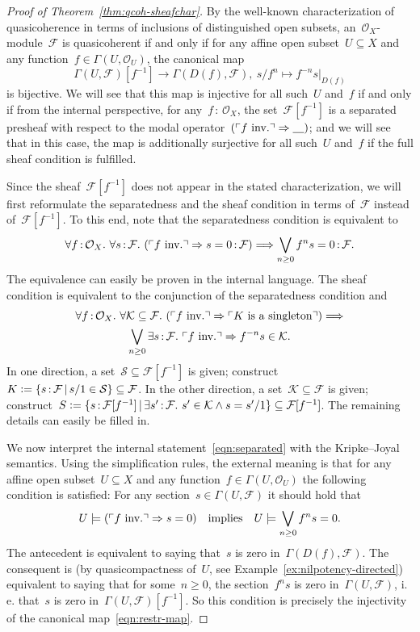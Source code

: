 \documentclass[10pt]{amsart}
\makeatletter
\theoremstyle{definition}
\theoremstyle{plain}
\theoremstyle{remark}
\newcommand{\F}{\mathcal{F}}
\renewcommand{\O}{\mathcal{O}}
\newcommand{\K}{\mathcal{K}}
\renewcommand{\S}{\mathcal{S}}
\newcommand{\placeholder}{\underline{\quad}}
\newcommand{\?}{\,{:}\,}
\renewcommand{\_}{\mathpunct{.}\,}
\newcommand{\speak}[1]{\ulcorner\text{\textnormal{#1}}\urcorner}
\newcommand{\lra}{\longrightarrow}
\newcommand{\ie}{i.\,e.\@\xspace}
\newcommand{\inv}{inv.\@}
\newcommand{\defeq}{\vcentcolon=}
\makeatother
\begin{document}
\begin{proof}[Proof of Theorem~\ref{thm:qcoh-sheafchar}]
By the well-known characterization of quasicoherence in terms of inclusions of
distinguished open subsets, an~$\O_X$-module~$\F$ is quasicoherent if and only
if for any affine open subset~$U \subseteq X$ and any function~$f \in
\Gamma(U,\O_U)$, the canonical map
\begin{equation}\label{eqn:restr-map}
  \Gamma(U,\F)[f^{-1}] \lra \Gamma(D(f),\F), \ s/f^n \longmapsto
  f^{-n} s|_{D(f)}
\end{equation}
is bijective. We will see that this map is injective for all such~$U$ and~$f$
if and only if from the internal perspective, for any~$f\?\O_X$, the set~$\F[f^{-1}]$ is a
separated presheaf with respect to the modal operator~$(\speak{$f$ \inv}
\Rightarrow \placeholder)$; and we will see that in this
case, the map is additionally surjective for all such~$U$ and~$f$ if the full
sheaf condition is fulfilled.

Since the sheaf~$\F[f^{-1}]$ does not appear in the stated characterization, we
will first reformulate the separatedness and the sheaf condition in terms
of~$\F$ instead of~$\F[f^{-1}]$. To this end, note that the separatedness
condition is equivalent to
\begin{equation}\label{eqn:separated}
  \forall f\?\O_X\_ \forall s\?\F\_
  (\speak{$f$ \inv} \Rightarrow s = 0 \? \F) \Longrightarrow
  \bigvee_{n \geq 0} f^n s = 0 \? \F.
\end{equation}
The equivalence can easily be proven in the internal language. The sheaf
condition is equivalent to the conjunction of the separatedness condition and
\begin{multline}\label{eqn:sheaf}
  \forall f\?\O_X\_ \forall \K \subseteq \F\_
  (\speak{$f$ \inv} \Rightarrow \speak{$K$ is a singleton})
  \Longrightarrow \\
  \bigvee_{n \geq 0} \exists s\?\F\_
  \speak{$f$ \inv} \Rightarrow f^{-n} s \in \K.
\end{multline}
In one direction, a set~$\S \subseteq \F[f^{-1}]$ is given; construct~$K \defeq \{
s\?\F \,|\, s/1 \in \S \} \subseteq \F$. In the other direction, a set~$\K
\subseteq \F$ is given; construct~$S \defeq \{ s\?\F[f^{-1}] \,|\, \exists
s'\?\F\_ s' \in \K \wedge s = s'/1 \} \subseteq \F[f^{-1}]$. The remaining
details can easily be filled in.

We now interpret the internal statement~\eqref{eqn:separated} with the
Kripke--Joyal semantics. Using the simplification rules, the external meaning
is that for any affine open subset~$U \subseteq X$ and any function~$f \in
\Gamma(U,\O_U)$ the following condition is satisfied: For any section~$s \in
\Gamma(U,\F)$ it should hold that
\[ U \models (\speak{$f$ \inv} \Rightarrow s = 0) \quad\text{implies}\quad
  U \models \bigvee_{n \geq 0} f^n s = 0. \]
The antecedent is equivalent to saying that~$s$ is zero in~$\Gamma(D(f),\F)$.
The consequent is (by quasicompactness of~$U$, see
Example~\ref{ex:nilpotency-directed}) equivalent to saying that for some~$n \geq 0$, the
section~$f^n s$ is zero in~$\Gamma(U,\F)$, \ie that~$s$ is zero
in~$\Gamma(U,\F)[f^{-1}]$. So this condition is precisely the injectivity of
the canonical map~\eqref{eqn:restr-map}.


\end{proof}
\end{document}
